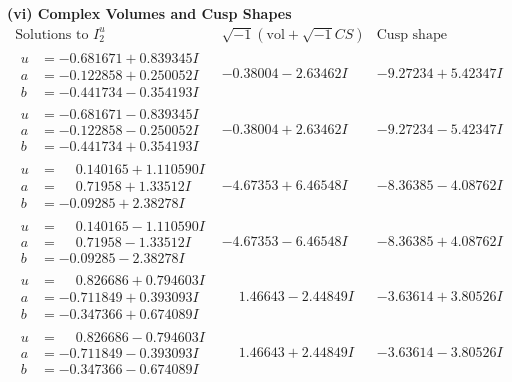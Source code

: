 \documentclass[1p]{elsarticle_modified}
\theoremstyle{definition}
\newcommand{\I}{\sqrt{-1}}
\begin{document}
\newpage\flushleft \textbf{(vi) Complex Volumes and Cusp Shapes}
$$\begin{array}{c|c|c}  
\text{Solutions to }I^u_{2}& \I (\text{vol} + \sqrt{-1}CS) & \text{Cusp shape}\\
 \hline 
\begin{aligned}
u &= -0.681671 + 0.839345 I \\
a &= -0.122858 + 0.250052 I \\
b &= -0.441734 - 0.354193 I\end{aligned}
 & -0.38004 - 2.63462 I & -9.27234 + 5.42347 I \\ \hline\begin{aligned}
u &= -0.681671 - 0.839345 I \\
a &= -0.122858 - 0.250052 I \\
b &= -0.441734 + 0.354193 I\end{aligned}
 & -0.38004 + 2.63462 I & -9.27234 - 5.42347 I \\ \hline\begin{aligned}
u &= \phantom{-}0.140165 + 1.110590 I \\
a &= \phantom{-}0.71958 + 1.33512 I \\
b &= -0.09285 + 2.38278 I\end{aligned}
 & -4.67353 + 6.46548 I & -8.36385 - 4.08762 I \\ \hline\begin{aligned}
u &= \phantom{-}0.140165 - 1.110590 I \\
a &= \phantom{-}0.71958 - 1.33512 I \\
b &= -0.09285 - 2.38278 I\end{aligned}
 & -4.67353 - 6.46548 I & -8.36385 + 4.08762 I \\ \hline\begin{aligned}
u &= \phantom{-}0.826686 + 0.794603 I \\
a &= -0.711849 + 0.393093 I \\
b &= -0.347366 + 0.674089 I\end{aligned}
 & \phantom{-}1.46643 - 2.44849 I & -3.63614 + 3.80526 I \\ \hline\begin{aligned}
u &= \phantom{-}0.826686 - 0.794603 I \\
a &= -0.711849 - 0.393093 I \\
b &= -0.347366 - 0.674089 I\end{aligned}
 & \phantom{-}1.46643 + 2.44849 I & -3.63614 - 3.80526 I \\ \hline\begin{aligned}

\end{aligned}
\end{array}$$
\end{document}
